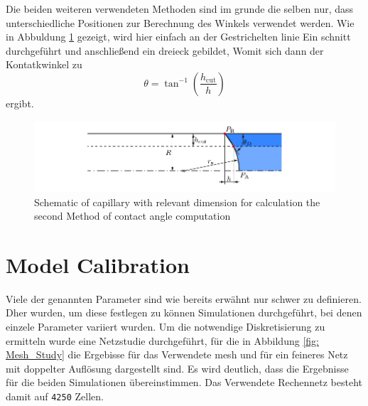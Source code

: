 Die beiden weiteren verwendeten Methoden sind im grunde die selben nur, dass unterschiedliche Positionen zur Berechnung des Winkels verwendet werden. Wie in Abbuldung \ref{fig: CA_Method2} gezeigt, wird hier einfach an der Gestrichelten linie Ein schnitt durchgeführt und anschließend ein dreieck gebildet, Womit sich dann der Kontatkwinkel zu
\begin{equation}
    \theta = \tan^{-1}\left(\frac{h_{\mathrm{cut}}}{h}\right)
\end{equation}
ergibt.

\begin{figure}[h]
    \centering
    \includegraphics[width=.95\textwidth]{Pictures/CA_CALCMEthod2.pdf}
    \caption{Schematic of capillary with relevant dimension for calculation the second Method of contact angle computation}
    \label{fig: CA_Method2}
\end{figure}


\section{Model Calibration}
Viele der genannten Parameter sind wie bereits erwähnt nur schwer zu definieren. Dher wurden, um diese festlegen zu können Simulationen durchgeführt, bei denen einzele Parameter variiert wurden. Um die notwendige Diskretisierung zu ermitteln wurde eine Netzstudie durchgeführt, für die in Abbildung \ref*{fig: Mesh_Study} die Ergebisse für das Verwendete mesh und für ein feineres Netz mit doppelter Auflösung dargestellt sind. Es wird deutlich, dass die Ergebnisse für die beiden Simulationen übereinstimmen. Das Verwendete Rechennetz besteht damit auf \texttt{4250} Zellen. 

